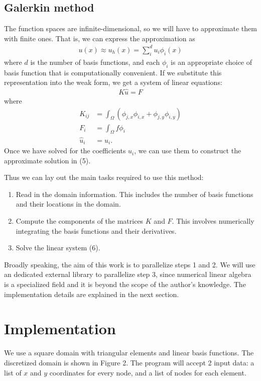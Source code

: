 \documentclass[12pt]{extreport}
\begin{document}
\subsection*{Galerkin method}
The function spaces are infinite-dimensional, so we will have to approximate them with finite ones. That is, we can express the approximation as
\begin{align}
  u(x) \approx u_h(x) = \sum_i^d u_i \phi_i(x)
\end{align}
where $d$ is the number of basis functions, and each $\phi_i$ is an appropriate choice of basis function that is computationally convenient. If we substitute this representation into the weak form, we get a system of linear equations:
\begin{align}
  K\hat{u} = F
\end{align}
where
\begin{align}
  K_{ij} &= \int_\Omega (\phi_{j,x} \phi_{i,x} + \phi_{j,y} \phi_{i,y}) \\
  F_i &= \int_\Omega f \phi_i \\
  \hat{u}_i &= u_i.
\end{align}
Once we have solved for the coefficients $u_i$, we can use them to construct the approximate solution in (5).

Thus we can lay out the main tasks required to use this method:
\begin{enumerate}
\item Read in the domain information. This includes the number of basis functions and their locations in the domain.
\item Compute the components of the matrices $K$ and $F$. This involves numerically integrating the basis functions and their derivatives.
\item Solve the linear system (6).
\end{enumerate}
Broadly speaking, the aim of this work is to parallelize steps 1 and 2. We will use an dedicated external library to parallelize step 3, since numerical linear algebra is a specialized field and it is beyond the scope of the author's knowledge. The implementation details are explained in the next section.

\section*{Implementation}
We use a square domain with triangular elements and linear basis functions. The discretized domain is shown in Figure 2. The program will accept 2 input data: a list of $x$ and $y$ coordinates for every node, and a list of nodes for each element.
\end{document}
